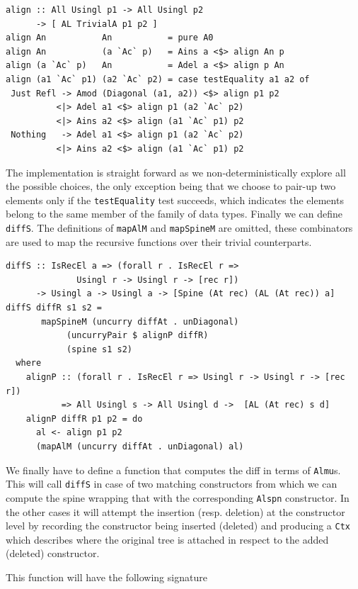 \documentclass[11pt, titlepage]{article}
\newcommand{\toHaskell}[1]{\texttt{#1}\xspace}
\begin{document}
\begin{verbatim}
align :: All Usingl p1 -> All Usingl p2
      -> [ AL TrivialA p1 p2 ]
align An           An           = pure A0
align An           (a `Ac` p)   = Ains a <$> align An p
align (a `Ac` p)   An           = Adel a <$> align p An
align (a1 `Ac` p1) (a2 `Ac` p2) = case testEquality a1 a2 of
 Just Refl -> Amod (Diagonal (a1, a2)) <$> align p1 p2
          <|> Adel a1 <$> align p1 (a2 `Ac` p2)
          <|> Ains a2 <$> align (a1 `Ac` p1) p2
 Nothing   -> Adel a1 <$> align p1 (a2 `Ac` p2)
          <|> Ains a2 <$> align (a1 `Ac` p1) p2
\end{verbatim}

The implementation is straight forward as we non-deterministically explore all the possible choices, the only exception being that we choose to pair-up two elements only if the \toHaskell{testEquality} test succeeds, which indicates the elements belong to the same member of the family of data types.
Finally we can define \toHaskell{diffS}. The definitions of \toHaskell{mapAlM} and \toHaskell{mapSpineM} are omitted, these combinators are used to map the recursive functions over their trivial counterparts.
\begin{verbatim}
diffS :: IsRecEl a => (forall r . IsRecEl r => 
		      Usingl r -> Usingl r -> [rec r])
      -> Usingl a -> Usingl a -> [Spine (At rec) (AL (At rec)) a]
diffS diffR s1 s2 =
       mapSpineM (uncurry diffAt . unDiagonal)
            (uncurryPair $ alignP diffR) 
            (spine s1 s2)
  where
    alignP :: (forall r . IsRecEl r => Usingl r -> Usingl r -> [rec r])
           => All Usingl s -> All Usingl d ->  [AL (At rec) s d]
    alignP diffR p1 p2 = do
      al <- align p1 p2
      (mapAlM (uncurry diffAt . unDiagonal) al)
\end{verbatim}

We finally have to define a function that computes the diff in terms of \texttt{Almu}s. This will call \texttt{diffS} in case of two matching constructors from which we can compute the spine wrapping that with the corresponding \texttt{Alspn} constructor. In the other cases it will attempt the insertion (resp. deletion) at the constructor level by recording the constructor being inserted (deleted) and producing a \texttt{Ctx} which describes where the original tree is attached in respect to the added (deleted) constructor.

This function will have the following signature
\end{document}
